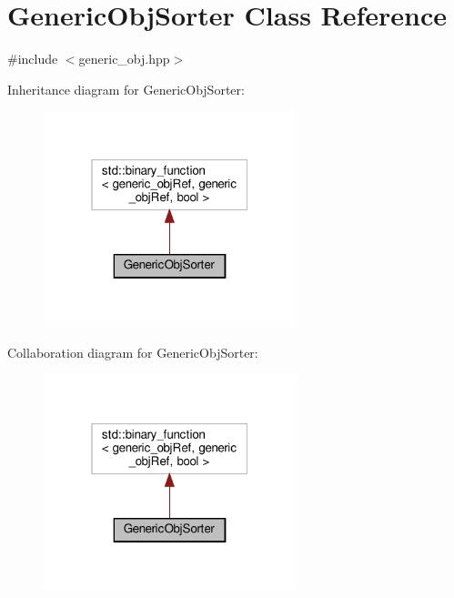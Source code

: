 \hypertarget{classGenericObjSorter}{}\section{Generic\+Obj\+Sorter Class Reference}
\label{classGenericObjSorter}


{\ttfamily \#include $<$generic\+\_\+obj.\+hpp$>$}



Inheritance diagram for Generic\+Obj\+Sorter\+:
\nopagebreak
\begin{figure}[H]
\begin{center}
\leavevmode
\includegraphics[width=208pt]{dd/d1b/classGenericObjSorter__inherit__graph}
\end{center}
\end{figure}


Collaboration diagram for Generic\+Obj\+Sorter\+:
\nopagebreak
\begin{figure}[H]
\begin{center}
\leavevmode
\includegraphics[width=208pt]{dd/dca/classGenericObjSorter__coll__graph}
\end{center}
\end{figure}
